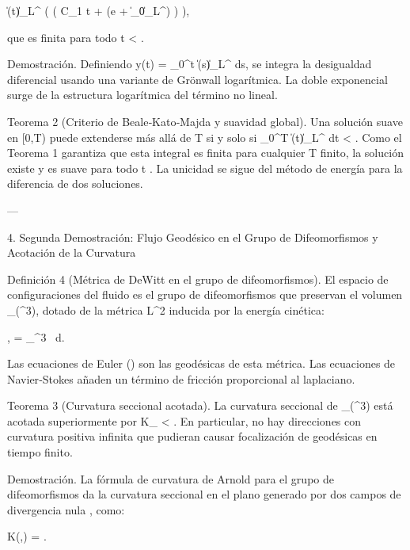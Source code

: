 \documentclass[12pt,twoside]{book}
\begin{document}
\|\boldsymbol{\omega}(t)\|_{L^\infty} \le \exp\left( \exp\left( C_1 t + \ln\ln(e + \|\boldsymbol{\omega}_0\|_{L^\infty}) \right) \right),

que es finita para todo t < \infty.

Demostración. Definiendo y(t) = \int_0^t \|\boldsymbol{\omega}(s)\|_{L^\infty} ds, se integra la desigualdad diferencial usando una variante de Grönwall logarítmica. La doble exponencial surge de la estructura logarítmica del término no lineal.

Teorema 2 (Criterio de Beale‑Kato‑Majda y suavidad global). Una solución suave en [0,T) puede extenderse más allá de T si y solo si \int_0^T \|\boldsymbol{\omega}(t)\|_{L^\infty} dt < \infty. Como el Teorema 1 garantiza que esta integral es finita para cualquier T finito, la solución existe y es suave para todo t . La unicidad se sigue del método de energía para la diferencia de dos soluciones.

---

4. Segunda Demostración: Flujo Geodésico en el Grupo de Difeomorfismos y Acotación de la Curvatura

Definición 4 (Métrica de DeWitt en el grupo de difeomorfismos). El espacio de configuraciones del fluido es el grupo de difeomorfismos que preservan el volumen _\mu(^3), dotado de la métrica L^2 inducida por la energía cinética:

\langle {},  \rangle = \int_{^3} \cdot{} \, d.

Las ecuaciones de Euler () son las geodésicas de esta métrica. Las ecuaciones de Navier‑Stokes añaden un término de fricción proporcional al laplaciano.

Teorema 3 (Curvatura seccional acotada). La curvatura seccional de _\mu(^3) está acotada superiormente por K_{\max} < \infty. En particular, no hay direcciones con curvatura positiva infinita que pudieran causar focalización de geodésicas en tiempo finito.

Demostración. La fórmula de curvatura de Arnold para el grupo de difeomorfismos da la curvatura seccional en el plano generado por dos campos de divergencia nula ,  como:

K(,) = .
\end{document}
